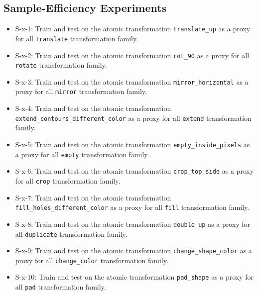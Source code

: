 \subsection{Sample-Efficiency Experiments}

\begin{itemize} 
    \item S-x-1: Train and test on the atomic transformation \texttt{translate\_up} as a proxy for all \texttt{translate} transformation family.
    
    \item S-x-2: Train and test on the atomic transformation \texttt{rot\_90} as a proxy for all \texttt{rotate} transformation family.

    \item S-x-3: Train and test on the atomic transformation \texttt{mirror\_horizontal} as a proxy for all \texttt{mirror} transformation family.  

    \item S-x-4: Train and test on the atomic transformation \texttt{extend\_contours\_different\_color} as a proxy for all \texttt{extend} transformation family.  

    \item S-x-5: Train and test on the atomic transformation \texttt{empty\_inside\_pixels} as a proxy for all \texttt{empty} transformation family.  

    \item S-x-6: Train and test on the atomic transformation \texttt{crop\_top\_side} as a proxy for all \texttt{crop} transformation family.  

    \item S-x-7: Train and test on the atomic transformation \texttt{fill\_holes\_different\_color} as a proxy for all \texttt{fill} transformation family.  

    \item S-x-8: Train and test on the atomic transformation \texttt{double\_up} as a proxy for all \texttt{duplicate} transformation family.  

    \item S-x-9: Train and test on the atomic transformation \texttt{change\_shape\_color} as a proxy for all \texttt{change\_color} transformation family.

    \item S-x-10: Train and test on the atomic transformation \texttt{pad\_shape} as a proxy for all \texttt{pad} transformation family.  
\end{itemize}

